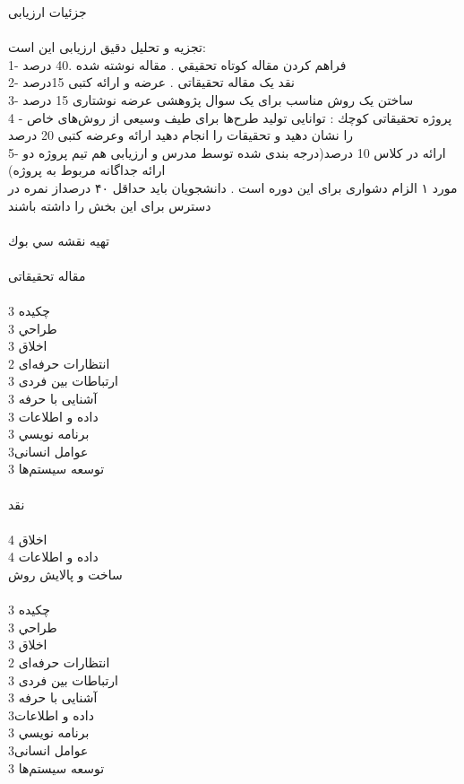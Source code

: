 \documentclass[a4 paper,12pt]{article}\usepackage{float, graphicx,xepersian }
\begin{document}
\noindent   
   جزئیات ارزیابی  \\
   \\
   تجزیه و تحلیل دقیق ارزیابی این است:\\
   1- فراهم كردن مقاله کوتاه تحقیقي . مقاله نوشته شده .40 درصد\\
   2- نقد یک مقاله تحقیقاتی . عرضه و ارائه کتبی  15درصد\\
   3- ساختن یک روش مناسب برای یک سوال پژوهشی عرضه نوشتاری 15 درصد\\
   4 - پروژه تحقیقاتی كوچك : توانایی تولید طرح‌ها برای طیف وسیعی از روش‌های خاص را نشان دهید و تحقیقات را انجام دهید ارائه وعرضه کتبی 20 درصد\\
   5- ارائه در کلاس 10 درصد(درجه بندی شده توسط مدرس و ارزیابی هم تیم پروژه دو ارائه جداگانه مربوط به پروژه)\\
      مورد ۱ الزام دشواری برای این دوره است . دانشجويان باید حداقل ۴۰  درصداز نمره در دسترس برای این بخش را داشته باشند \\
\noindent
\\      
   تهیه نقشه سي بوك\\
   \\
\noindent   
   مقاله تحقیقاتی\\
   \\
   چكيده 3\\
   طراحي 3 \\
   اخلاق  3\\
   انتظارات حرفه‌ای  2 \\
   ارتباطات بین فردی 3 \\
   آشنایی با حرفه
3\\
\noindent
داده و اطلاعات 3\\
برنامه نويسي 3 \\
عوامل انسانی3  \\
توسعه سیستم‌ها 3 \\
\\
نقد \\
\\
اخلاق 4 \\
داده و اطلاعات 4  \\

\noindent
ساخت و پالایش روش \\
\\
چكيده 3 \\
طراحي  3 \\
اخلاق  3  \\
انتظارات حرفه‌ای 2 \\
ارتباطات بین فردی 3\\
آشنایی با حرفه
3\\
داده و اطلاعات3  \\
برنامه نويسي 3\\
عوامل انسانی3  \\
توسعه سیستم‌ها 3\\
\end{document}
